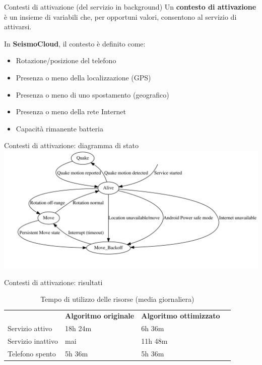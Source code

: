 \begin{frame}[c]{Contesti di attivazione (del servizio in background)}
Un \textbf{contesto di attivazione} è un insieme di variabili che, per opportuni valori, consentono al servizio di attivarsi.

\vspace{0.5cm}
In \textbf{SeismoCloud}, il contesto è definito come:
\vspace{0.2cm}
\begin{itemize}
  \item Rotazione/posizione del telefono
  \item Presenza o meno della localizzazione (GPS)
  \item Presenza o meno di uno spostamento (geografico)
  \item Presenza o meno della rete Internet
  \item Capacità rimanente batteria
\end{itemize}
\end{frame}

\begin{frame}[c]{Contesti di attivazione: diagramma di stato}
\includegraphics[scale=0.47]{StateMachine3}
\end{frame}

\begin{frame}[c]{Contesti di attivazione: risultati}

\begin{center}
\begin{table}[h]
\begin{tabular}{llll}
& \textbf{Algoritmo originale} & \textbf{Algoritmo ottimizzato} &  \\
Servizio attivo   & 18h 24m & 6h 36m & \\
Servizio inattivo & mai     & 11h 48m & \\
Telefono spento   & 5h 36m  & 5h 36m &
\end{tabular}
\caption{Tempo di utilizzo delle risorse (media giornaliera)}
\end{table}
\end{center}

\end{frame}

